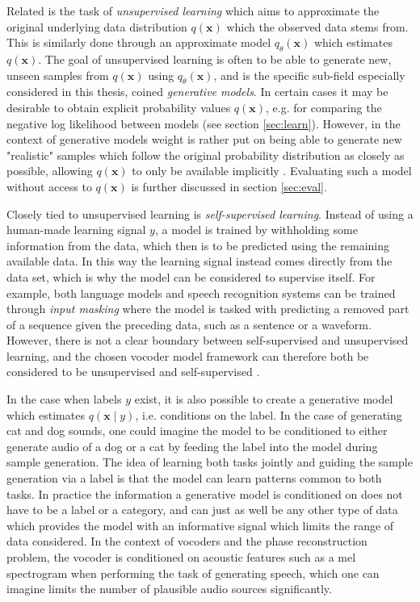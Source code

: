 \documentclass{article}
\begin{document}
Related is the task of \textit{unsupervised learning} which aims to approximate the original underlying data distribution $q(\bm{x})$ which the observed data stems from. This is similarly done through an approximate model $q_{\theta}(\bm{x})$ which estimates $q(\bm{x})$. The goal of unsupervised learning is often to be able to generate new, unseen samples from $q(\bm{x})$ using $q_{\theta}(\bm{x})$, and is the specific sub-field especially considered in this thesis, coined \textit{generative models}. In certain cases it may be desirable to obtain explicit probability values $q(\bm{x})$, e.g. for comparing the negative log likelihood between models (see section \ref{sec:learn}). However, in the context of generative models weight is rather put on being able to generate new "realistic" samples which follow the original probability distribution as closely as possible, allowing $q(\bm{x})$ to only be available implicitly \cite{foster2019generative}. Evaluating such a model without access to $q(\bm{x})$ is further discussed in section \ref{sec:eval}.

Closely tied to unsupervised learning is \textit{self-supervised learning}. Instead of using a human-made learning signal $y$, a model is trained by withholding some information from the data, which then is to be predicted using the remaining available data. In this way the learning signal instead comes directly from the data set, which is why the model can be considered to supervise itself. For example, both language models and speech recognition systems can be trained through \textit{input masking} where the model is tasked with predicting a removed part of a sequence given the preceding data, such as a sentence or a waveform. However, there is not a clear boundary between self-supervised and unsupervised learning, and the chosen vocoder model framework can therefore both be considered to be unsupervised and self-supervised \cite{baevski2020wav2vec, devlin2018bert}.

In the case when labels $y$ exist, it is also possible to create a generative model which estimates $q(\bm{x} \mid y)$, i.e. conditions on the label. In the case of generating cat and dog sounds, one could imagine the model to be conditioned to either generate audio of a dog or a cat by feeding the label into the model during sample generation. The idea of learning both tasks jointly and guiding the sample generation via a label is that the model can learn patterns common to both tasks. In practice the information a generative model is conditioned on does not have to be a label or a category, and can just as well be any other type of data which provides the model with an informative signal which limits the range of data considered. In the context of vocoders and the phase reconstruction problem, the vocoder is conditioned on acoustic features such as a mel spectrogram when performing the task of generating speech, which one can imagine limits the number of plausible audio sources significantly.
\end{document}
